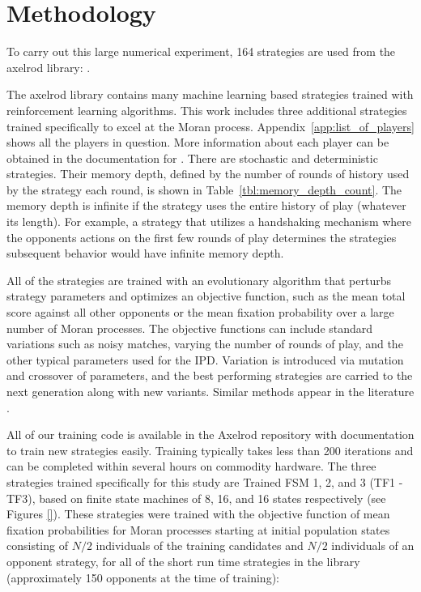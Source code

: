 \documentclass{article}
\begin{document}
\section{Methodology}\label{sec:methodology}

To carry out this large numerical experiment, 164 strategies are used from the
axelrod library: \cite{axelrodproject}.

The axelrod library contains many machine learning based strategies trained
with reinforcement learning algorithms. This work includes three additional
strategies trained specifically to excel at the Moran process.
Appendix~\ref{app:list_of_players} shows all the players in question. More
information about each player can be obtained in the documentation for
\cite{axelrodproject}. There are stochastic and
deterministic strategies. Their memory
depth, defined by the number of rounds of history used by the strategy each round,
is shown in Table~\ref{tbl:memory_depth_count}. The memory depth is infinite if
the strategy uses the entire history of play (whatever its length). For example,
a strategy that utilizes a handshaking mechanism where the opponents actions
on the first few rounds of play determines the strategies subsequent behavior
would have infinite memory depth.

All of the
strategies are trained with an evolutionary algorithm that perturbs strategy
parameters and optimizes an objective function, such as the mean total score
against all other opponents or the mean fixation probability over a large
number of Moran processes. The objective functions can include standard
variations such as noisy matches, varying the number of rounds of play, and the
other typical parameters used for the IPD. Variation is introduced via mutation
and crossover of parameters, and the best performing strategies are carried to
the next generation along with new variants. Similar methods appear in the
literature \cite{Ashlock2006}.

All of our training code is available in the
Axelrod repository with documentation to train new strategies easily. Training
typically takes less than 200 iterations and can be completed within several
hours on commodity hardware.  The three strategies trained specifically for
this study are Trained FSM 1, 2, and 3 (TF1 - TF3), based on finite state
machines of 8, 16, and 16 states respectively (see Figures \ref{}).
These strategies were trained with the objective function of mean fixation
probabilities for Moran processes starting at initial population states
consisting of \(N/2\) individuals of the training candidates and \(N/2\)
individuals of an opponent strategy, for all of the short run time strategies
in the library (approximately 150 opponents at the time of training):
\end{document}
